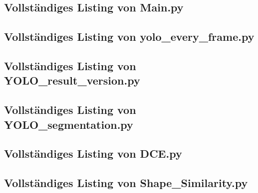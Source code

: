 \subsection{Vollständiges Listing von Main.py}{
    }

\subsection{Vollständiges Listing von yolo\_every\_frame.py}{
    }

\subsection{Vollständiges Listing von YOLO\_result\_version.py}{
    }

\subsection{Vollständiges Listing von YOLO\_segmentation.py}{
    }

\subsection{Vollständiges Listing von DCE.py}{
    }

\subsection{ Vollständiges Listing von Shape\_Similarity.py}{
    
}

